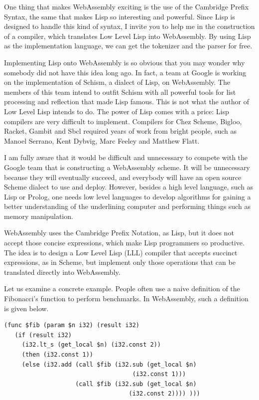 \documentclass[a4paper,12pt]{book}
\begin{document}
One thing that makes WebAssembly exciting is the use of
the Cambridge Prefix Syntax, the same that makes Lisp
so interesting and powerful. Since Lisp is designed
to handle this kind of syntax, I invite you to help me
in the construction of a compiler, which translates
Low Level Lisp into WebAssembly. By using Lisp as the
implementation language, we can get the tokenizer and
the parser for free.

Implementing Lisp onto WebAssembly is so obvious that you
may wonder why somebody did not have this idea
long ago. In fact, a team at Google is working on
the implementation of Schism, a dialect of Lisp, on
WebAssembly. The members of this team intend to outfit
Schism with all powerful tools for list processing
and reflection that made Lisp famous. This is not what
the author of Low Level Lisp intends to do. The power
of Lisp comes with a price: Lisp compilers are very
difficult to implement. Compilers for Chez Scheme,
Bigloo, Racket, Gambit and Sbcl required years of
work from bright people, such as Manoel Serrano, Kent
Dybvig, Marc Feeley and Matthew Flatt.

I am fully aware that it would be difficult and unnecessary
to compete with the Google team that is constructing a
WebAssembly scheme. It will be unnecessary because they
will eventually succeed, and everybody will have an
open source Scheme dialect to use and deploy. However,
besides a high level language, such as Lisp or Prolog,
one needs low level languages to develop algorithms
for gaining a better understanding of the underlining
computer and performing things such as memory manipulation.

WebAssembly uses the Cambridge Prefix Notation, as Lisp,
but it does not accept those concise expressions, which
make Lisp programmers so productive. The idea is to design
a Low Level Lisp (LLL) compiler that accepts succinct
expressions, as in Scheme, but implement only those
operations that can be translated directly into WebAssembly.

Let us examine a concrete example. People often use a naive
definition of the Fibonacci's function to perform benchmarks.
In WebAssembly, such a definition is given below.

\begin{verbatim}
(func $fib (param $n i32) (result i32)
   (if (result i32)
     (i32.lt_s (get_local $n) (i32.const 2))
     (then (i32.const 1)) 
     (else (i32.add (call $fib (i32.sub (get_local $n)
                                    (i32.const 1)))
                    (call $fib (i32.sub (get_local $n) 
                                   (i32.const 2)))) )))
\end{verbatim}
\end{document}
